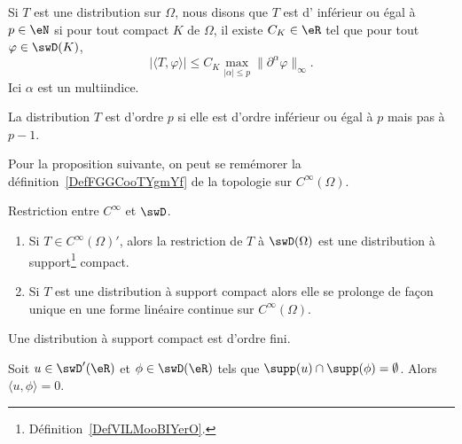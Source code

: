 \begin{definition}  \label{DefXAHIooFeiRMB}
	Si \( T\) est une distribution sur \( \Omega\), nous disons que \( T\) est d' inférieur ou égal à \( p\in \eN\) si pour tout compact \( K\) de \( \Omega\), il existe \( C_K\in \eR\) tel que pour tout \( \varphi\in \swD(K)\),
	\begin{equation}
		\big| \langle T, \varphi\rangle  \big|\leq C_K\max_{| \alpha |\leq p}\| \partial^{\alpha}\varphi \|_{\infty}.
	\end{equation}
	Ici \( \alpha\) est un multiindice.

	La distribution \( T\) est d'ordre \( p\) si elle est d'ordre inférieur ou égal à \( p\) mais pas à \( p-1\).
\end{definition}

Pour la proposition suivante, on peut se remémorer la définition~\ref{DefFGGCooTYgmYf} de la topologie sur \(  C^{\infty}(\Omega)\).
\begin{proposition}		\label{PROPooSQPHooDPOrqK}
	Restriction entre \(  C^{\infty}\) et \( \swD\).
	\begin{enumerate}
		\item
		      Si \( T\in C^{\infty}(\Omega)'\), alors la restriction de \( T\) à \( \swD(\Omega)\) est une distribution à support\footnote{Définition~\ref{DefVILMooBIYerO}.} compact.
		\item
		      Si \( T\) est une distribution à support compact alors elle se prolonge de façon unique en une forme linéaire continue sur \(  C^{\infty}(\Omega)\).
	\end{enumerate}
\end{proposition}

\begin{proposition}     \label{PropZLUEooHcVxQj}
	Une distribution à support compact est d'ordre fini.
\end{proposition}

\begin{lemma}   \label{LemYHRDooOdSnnK}
	Soit \( u\in\swD'(\eR)\) et \( \phi\in\swD(\eR)\) tels que \( \supp(u)\cap\supp(\phi)=\emptyset\). Alors \( \langle u, \phi\rangle =0\).
\end{lemma}

